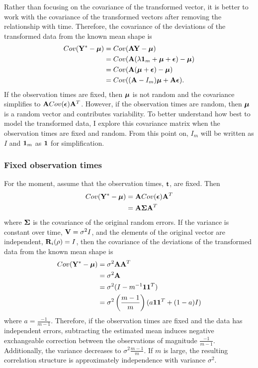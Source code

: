 Rather than focusing on the covariance of the transformed vector, it is better to work with the covariance of the transformed vectors after removing the relationship with time. Therefore, the covariance of the deviations of the transformed data from the known mean shape is
\begin{align*}
Cov(\mathbf Y^{*} - \boldsymbol\mu) &= Cov(\mathbf A\mathbf Y - \boldsymbol\mu)\\
&= Cov(\mathbf A(\lambda\mathbf 1_{m} + \boldsymbol\mu + \boldsymbol\epsilon) - \boldsymbol\mu)\\
&= Cov(\mathbf A(\boldsymbol\mu + \boldsymbol\epsilon) - \boldsymbol\mu)\\
&= Cov((\mathbf A-I_{m})\boldsymbol\mu + \mathbf A \boldsymbol\epsilon).
\end{align*}
If the observation times are fixed, then $\boldsymbol \mu$ is not random and the covariance simplifies to $\mathbf A Cov(\boldsymbol\epsilon)\mathbf A^{T}$. However, if the observation times are random, then $\boldsymbol \mu$ is a random vector and contributes variability. To better understand how best to model the transformed data, I explore this covariance matrix when the observation times are fixed and random. From this point on, $I_{m}$ will be written as $I$ and $\mathbf 1_{m}$ as $\mathbf 1$ for simplification.

\subsubsection{Fixed observation times}
For the moment, assume that the observation times, $\mathbf t$, are fixed. Then
\begin{align*}
Cov(\mathbf Y^{*} - \boldsymbol\mu)&= \mathbf ACov(\boldsymbol\epsilon)\mathbf A^{T}\\
&= \mathbf A\boldsymbol\Sigma \mathbf A^{T}
\end{align*}
where $\boldsymbol\Sigma$ is the covariance of the original random errors. If the variance is constant over time, $\mathbf V=\sigma^{2}I$, and the elements of the original vector are independent, $\mathbf R_{i}(\rho)=I$, then the covariance of the deviations of the transformed data from the known mean shape is
\begin{align*} 
Cov(\mathbf Y^{*}- \boldsymbol\mu) &= \sigma^{2}\mathbf A\mathbf A^{T} \\
&=\sigma^{2}\mathbf A\\
&= \sigma^{2}(I - m^{-1}\mathbf1\mathbf1^{T})\\
&=\sigma^{2}\left(\frac{m-1}{m}\right)(a\mathbf 1\mathbf 1^{T}+ (1-a)I)
\end{align*}
 where $a=\frac{-1}{m-1}$. Therefore, if the observation times are fixed and the data has independent errors, subtracting the estimated mean induces negative exchangeable correction between the observations of magnitude $\frac{-1}{m-1}$. Additionally, the variance decreases to $\sigma^{2}\frac{m-1}{m}$. If $m$ is large, the resulting correlation structure is approximately independence with variance $\sigma^{2}$.
 
